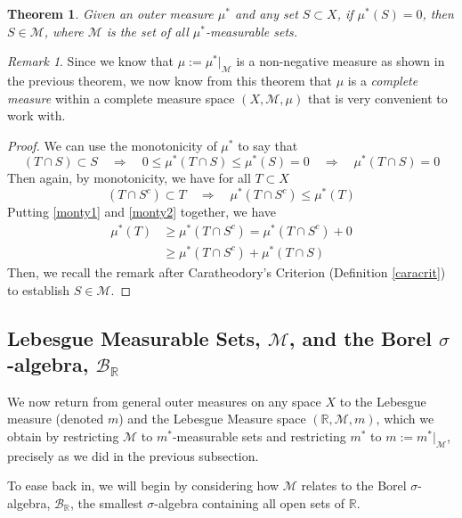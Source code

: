 \documentclass[12pt]{article}
\theoremstyle{plain}
\newtheorem{thm}{Theorem}[subsection]
\theoremstyle{definition}
\theoremstyle{remark}
\newtheorem*{rmk}{Remark}
\begin{document}
\begin{thm}
Given an outer measure $\mu^*$ and any set $S\subset X$, if $\mu^*(S)=0$, then $S\in\mathscr{M}$, where $\mathscr{M}$ is the set of all $\mu^*$-measurable sets. 
\end{thm}
\begin{rmk}
Since we know that $\mu:=\mu^*|_{\mathscr{M}}$ is a non-negative measure as shown in the previous theorem, we now know from this theorem that $\mu$ is a \emph{complete measure} within a complete measure space $(X, \mathscr{M}, \mu)$ that is very convenient to work with.
\end{rmk}
\begin{proof}
We can use the monotonicity of $\mu^*$ to say that
\begin{equation}
    \label{monty1}
    (T\cap S) \subset S 
    \quad \Rightarrow\quad
    0\leq\mu^*(T\cap S) \leq \mu^*(S) = 0
    \quad \Rightarrow\quad
    \mu^*(T\cap S) = 0 
\end{equation}
Then again, by monotonicity, we have for all $T\subset X$
\begin{equation}
    \label{monty2}
    (T\cap S^c) \subset T
    \quad \Rightarrow\quad
    \mu^*(T\cap S^c) \leq \mu^*(T)
\end{equation}
Putting \ref{monty1} and \ref{monty2} together, we have
\begin{align*}
    \mu^*(T) &\geq 
    \mu^*(T\cap S^c) =  
    \mu^*(T\cap S^c) + 0  \\
    &\geq \mu^*(T\cap S^c) + \mu^*(T\cap S)
\end{align*}
Then, we recall the remark after Caratheodory's Criterion (Definition \ref{caracrit}) to establish $S\in\mathscr{M}$.

\end{proof}


\newpage
\subsection{Lebesgue Measurable Sets, $\mathscr{M}$, and the Borel $\sigma$-algebra, $\mathscr{B}_\mathbb{R}$}

We now return from general outer measures on any space $X$ to the Lebesgue measure (denoted $m$) and the Lebesgue Measure space $(\mathbb{R},\mathscr{M},m)$, which we obtain by restricting $\mathscr{M}$ to $m^*$-measurable sets and restricting $m^*$ to $m:=m^*|_\mathscr{M}$, precisely as we did in the previous subsection.

To ease back in, we will begin by considering how $\mathscr{M}$ relates to the Borel $\sigma$-algebra, $\mathscr{B}_\mathbb{R}$, the smallest $\sigma$-algebra containing all open sets of $\mathbb{R}$.
\end{document}
